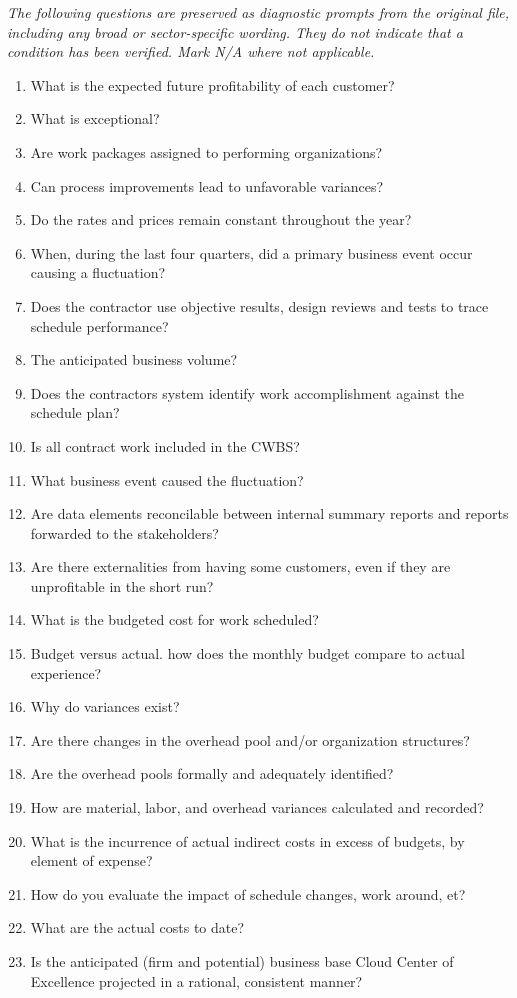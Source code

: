 \documentclass[10pt,letterpaper]{article}
\newcommand{\docsection}[1]{\par\Needspace{5\baselineskip}\vspace{8pt}{\large\sffamily\bfseries\color{navy}#1}\par\vspace{2pt}{\color{rulegrey}\rule{\linewidth}{.6pt}}\par}
\begin{document}
\docsection{03 \quad Source diagnostic checklist}
\textit{The following questions are preserved as diagnostic prompts from the original file, including any broad or sector-specific wording. They do not indicate that a condition has been verified. Mark N/A where not applicable.}
\begingroup\small\begin{enumerate}[leftmargin=2.1em, itemsep=4pt]
\item[1.] What is the expected future profitability of each customer?
\item[2.] What is exceptional?
\item[3.] Are work packages assigned to performing organizations?
\item[4.] Can process improvements lead to unfavorable variances?
\item[5.] Do the rates and prices remain constant throughout the year?
\item[6.] When, during the last four quarters, did a primary business event occur causing a fluctuation?
\item[7.] Does the contractor use objective results, design reviews and tests to trace schedule performance?
\item[8.] The anticipated business volume?
\item[9.] Does the contractors system identify work accomplishment against the schedule plan?
\item[10.] Is all contract work included in the CWBS?
\item[11.] What business event caused the fluctuation?
\item[12.] Are data elements reconcilable between internal summary reports and reports forwarded to the stakeholders?
\item[13.] Are there externalities from having some customers, even if they are unprofitable in the short run?
\item[14.] What is the budgeted cost for work scheduled?
\item[15.] Budget versus actual. how does the monthly budget compare to actual experience?
\item[16.] Why do variances exist?
\item[17.] Are there changes in the overhead pool and/or organization structures?
\item[18.] Are the overhead pools formally and adequately identified?
\item[19.] How are material, labor, and overhead variances calculated and recorded?
\item[20.] What is the incurrence of actual indirect costs in excess of budgets, by element of expense?
\item[21.] How do you evaluate the impact of schedule changes, work around, et?
\item[22.] What are the actual costs to date?
\item[23.] Is the anticipated (firm and potential) business base Cloud Center of Excellence projected in a rational, consistent manner?
\end{enumerate}\endgroup
\end{document}
